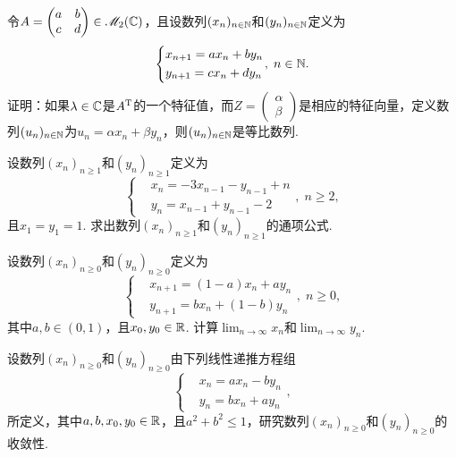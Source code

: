 \begin{mybox}
  \begin{problem}[一个等比数列.] 令$A=\begin{pmatrix}
    a & b \\
    c & d
  \end{pmatrix}\in\mathscr M_2(\mathbb C)$，且设数列$(x_n)_{n\in\mathbb N}$和$(y_n)_{n\in\mathbb N}$定义为
  \[
    \left\{
      \begin{aligned}
        & x_{n+1} = ax_n + by_n \\
        & y_{n+1} = cx_n + dy_n
      \end{aligned}
    \right.,\; n\in\MN.
  \]
  证明：如果$\lambda\in\mathbb C$是$A^{\mathrm T}$的一个特征值，而$Z=\begin{pmatrix}
    \alpha \\ \beta
  \end{pmatrix}$是相应的特征向量，定义数列$(u_n)_{n\in\mathbb N}$为$u_n=\alpha x_n+\beta y_n$，则$(u_n)_ {n\in\mathbb N}$是等比数列.
  \end{problem}
\end{mybox}

\begin{problem}
  设数列$(x_n)_{n\ge1}$和$(y_n)_{n\ge1}$定义为
  \[
    \left\{
      \begin{aligned}
        & x_n = -3x_{n-1} - y_{n-1} + n \\
        & y_n = x_{n-1} + y_{n-1} - 2
      \end{aligned}
    \right.,\; n\ge2,
  \]
  且$x_1=y_1=1$. 求出数列$(x_n)_{n\ge1}$和$(y_n)_{n\ge1}$的通项公式.
\end{problem}

\begin{problem}
  设数列$(x_n)_{n\ge0}$和$(y_n)_{n\ge0}$定义为
  \[
    \left\{
      \begin{aligned}
        & x_{n+1} = (1 - a)x_n + ay_n \\
        & y_{n+1} = bx_n + (1 - b)y_n
      \end{aligned}
    \right.,\; n\ge0,
  \]
  其中$a,b\in(0,1)$，且$x_0,y_0\in\mathbb R$. 计算$\lim_{n\to\infty}x_n$和$\lim_{n\to\infty}y_n$.
\end{problem}

\begin{problem}
  设数列$(x_n)_{n\ge0}$和$(y_n)_{n\ge0}$由下列线性递推方程组
  \[
    \left\{
      \begin{aligned}
        & x_n = ax_n - by_n \\
        & y_n = bx_n + ay_n
      \end{aligned}
    \right.,
  \]
  所定义，其中$a,b,x_0,y_0\in\mathbb R$，且$a^2+b^2\le1$，研究数列$(x_n)_{n\ge0}$和$(y_n)_{n\ge0}$的收敛性.
\end{problem}

